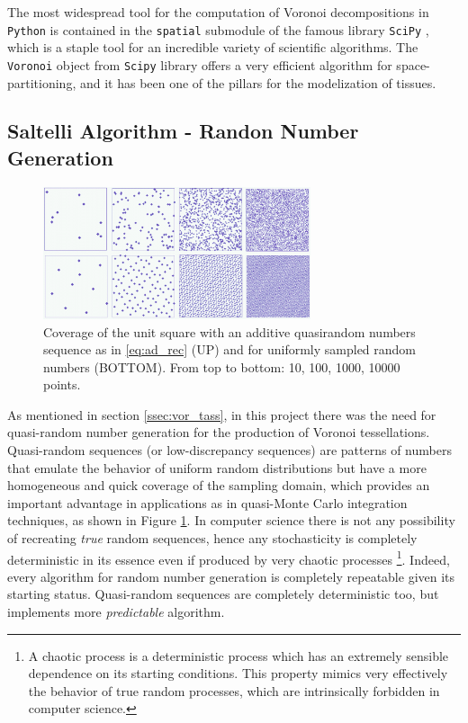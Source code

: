 The most widespread tool for the computation of Voronoi decompositions in \texttt{Python} is contained in the \texttt{spatial} submodule of the famous library \texttt{SciPy} \cite{2020SciPy-NMeth}, which is a staple tool for an incredible variety of scientific algorithms. The \texttt{Voronoi} object from \texttt{Scipy} library offers a very efficient algorithm for space-partitioning, and it has been one of the pillars for the modelization of tissues.

\subsection{Saltelli Algorithm - Randon Number Generation}
\begin{figure}
    \centering
    \includegraphics[width = 0.7\textwidth]{images/Subrandom_2D}
    \caption{Coverage of the unit square with an additive quasirandom numbers sequence as in \ref{eq:ad_rec} (UP) and for uniformly sampled random numbers (BOTTOM). From top to bottom: 10, 100, 1000, 10000 points.}
    \label{fig:Subrandom_2D}
\end{figure}
As mentioned in section \ref{ssec:vor_tass}, in this project there was the need for quasi-random number generation for the production of Voronoi tessellations. Quasi-random sequences (or low-discrepancy sequences) are patterns of numbers that emulate the behavior of uniform random distributions but have a more homogeneous and quick coverage of the sampling domain, which provides an important advantage in applications as in quasi-Monte Carlo integration techniques, as shown in Figure \ref{fig:Subrandom_2D}. In computer science there is not any possibility of recreating \textit{true} random sequences, hence any stochasticity is completely deterministic in its essence even if produced by very chaotic processes \footnote{A chaotic process is a deterministic process which has an extremely sensible dependence on its starting conditions. This property mimics very effectively the behavior of true random processes, which are intrinsically forbidden in computer science.}. Indeed, every algorithm for random number generation is completely repeatable given its starting status. Quasi-random sequences are completely deterministic too, but implements more \textit{predictable} algorithm.

